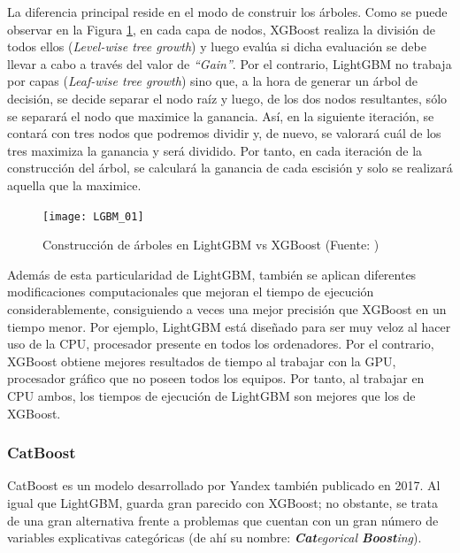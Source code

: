 \documentclass[12pt,twoside]{article}
\begin{document}
La diferencia principal reside en el modo de construir los árboles. Como se puede observar en la Figura \ref{fig:LGBM}, en cada capa de nodos, XGBoost realiza la división de todos ellos (\textit{Level-wise tree growth}) y luego evalúa si dicha evaluación se debe llevar a cabo a través del valor de \textit{``Gain''}. Por el contrario, LightGBM no trabaja por capas (\textit{Leaf-wise tree growth}) sino que, a la hora de generar un árbol de decisión, se decide separar el nodo raíz y luego, de los dos nodos resultantes, sólo se separará el nodo que maximice la ganancia. Así, en la siguiente iteración, se contará con tres nodos que podremos dividir y, de nuevo, se valorará cuál de los tres maximiza la ganancia y será dividido. Por tanto, en cada iteración de la construcción del árbol, se calculará la ganancia de cada escisión y solo se realizará aquella que la maximice.

\begin{figure}[h]
\centering
\texttt{[image: LGBM\_01]}
\caption{Construcción de árboles en LightGBM vs XGBoost (Fuente: \cite{MA01})}
\label{fig:LGBM}
\end{figure}


Además de esta particularidad de LightGBM, también se aplican diferentes modificaciones computacionales que mejoran el tiempo de ejecución considerablemente, consiguiendo a veces una mejor precisión que XGBoost en un tiempo menor. Por ejemplo, LightGBM está diseñado para ser muy veloz al hacer uso de la CPU, procesador presente en todos los ordenadores. Por el contrario, XGBoost obtiene mejores resultados de tiempo al trabajar con la GPU, procesador gráfico que no poseen todos los equipos. Por tanto, al trabajar en CPU ambos, los tiempos de ejecución de LightGBM son mejores que los de XGBoost.



\subsubsection{CatBoost} \label{sec:CatBoost}

CatBoost \cite{DO01} es un modelo desarrollado por Yandex también publicado en 2017. Al igual que LightGBM, guarda gran parecido con XGBoost; no obstante, se trata de una gran alternativa frente a problemas que cuentan con un gran número de variables explicativas categóricas (de ahí su nombre: \textit{\textbf{Cat}egorical \textbf{Boost}ing}).
\end{document}
